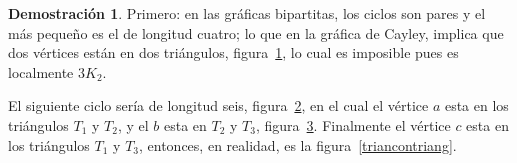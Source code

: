 \documentclass[12pt]{book}
\theoremstyle{definition}
\newtheorem{demostration}{Demostración}
\begin{document}
\begin{demostration}Primero: en las gráficas bipartitas, los ciclos
  son pares y el más pequeño es el de longitud cuatro; lo que en la
  gráfica de Cayley, implica que dos vértices están en dos triángulos,
  figura~\ref{bipcuello4}, lo cual es imposible pues es localmente
  $3K_2$.

\begin{figure}[htb]
  \centering
  \caption{} \label{bipcuello4}
\end{figure}



\begin{figure}\centering
  \caption{}\label{bipciclo6}
\end{figure}




El siguiente ciclo sería de longitud seis, figura~\ref{bipciclo6}, en
el cual el vértice $a$ esta en los triángulos $T_1$ y $T_2$, y el $b$
esta en $T_2$ y $T_3$, figura~\ref{bipartitalong6}. Finalmente el
vértice $c$ esta en los triángulos $T_1$ y $T_3$, entonces, en
realidad, es la figura~\ref{triancontriang}.


\begin{figure}[htb]
  \centering
  \caption{}
  \label{bipartitalong6}
\end{figure}


\end{demostration}
\end{document}
